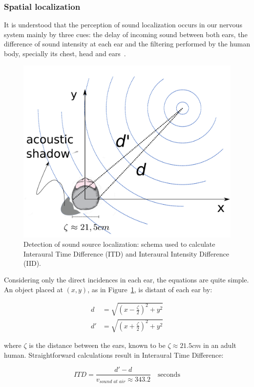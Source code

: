 \subsubsection{Spatial localization}
It is understood that the perception of sound localization occurs in our nervous system mainly by three cues: the delay of incoming sound between both ears, the difference of sound intensity at each ear and the filtering performed by the human body, specially its chest, head and ears~\cite{Roederer, hrtf, Heeger}. 

\begin{figure}[h!]
    \centering
        \includegraphics[width=.5\textwidth]{figures/espacializacao___}
    \caption{Detection of sound source localization: schema used to calculate Interaural Time Difference (ITD) and Interaural Intensity Difference (IID).}
    \label{fig:spac}
\end{figure}

Considering only the direct incidences in each ear, the equations are quite simple. An object placed at $(x,y)$, as in Figure~\ref{fig:spac}, is distant of each ear by:

\begin{equation}\label{eq:distOuvidos}
\begin{split}
d & =\sqrt{\left (x-\frac{\zeta}{2} \right )^2+y^2} \\
d' & =\sqrt{\left (x+\frac{\zeta}{2} \right )^2 + y^2}
\end{split}
\end{equation}

\noindent where $\zeta$ is the distance between the ears, known to be $\zeta \approx 21.5cm$ in an adult human. Straightforward calculations result in Interaural Time Difference:

\begin{equation}\label{eq:dti}
ITD=\frac{d'-d}{v_{sound\;at\;air}\approx 343.2 }\quad \text{seconds}
\end{equation}

